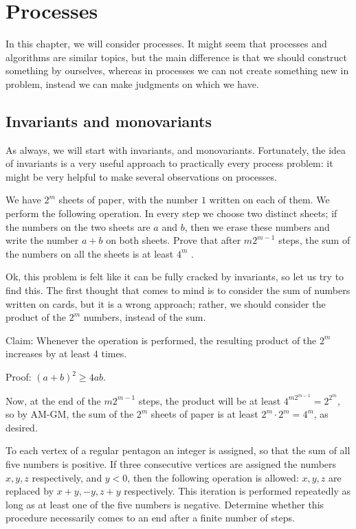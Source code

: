 \chapter{Processes}

In this chapter, we will consider processes. It might seem that processes and algorithms are similar topics, but the main difference is that we should construct something by ourselves, whereas in processes we can not create something new in problem, instead we can make judgments on which we have.

\section{Invariants and monovariants}

As always, we will start with invariants, and monovariants. Fortunately, the idea of invariants is a very useful approach to practically every process problem: it might be very helpful to make several observations on processes.

\begin{example}[ISL 2014]
    We have $2^m$ sheets of paper, with the number $1$ written on each of them. We perform the following operation. In every step we choose two distinct sheets; if the numbers on the two sheets are $a$ and $b$, then we erase these numbers and write the number $a + b$ on both sheets. Prove that after $m2^{m -1}$ steps, the sum of the numbers on all the sheets is at least $4^m$ .
\end{example}

\sol Ok, this problem is felt like it can be fully cracked by invariants, so let us try to find this. The first thought that comes to mind is to consider the sum of numbers written on cards, but it is a wrong approach; rather, we should consider the product of the $2^m$ numbers, instead of the sum.

Claim: Whenever the operation is performed, the resulting product of the $2^m$ increases by at least $4$ times.

Proof: $(a+b)^2 \geq 4ab$.

Now, at the end of the $m2^{m-1}$ steps, the product will be at least $4^{m2^{m-1}} = 2^{2^m}$, so by AM-GM, the sum of the $2^m$ sheets of paper is at least $2^m \cdot 2^m = 4^m$, as desired.

\begin{example}[IMO 1986]
    To each vertex of a regular pentagon an integer is assigned, so that the sum of all five numbers is positive. If three consecutive vertices are assigned the numbers $x,y,z$ respectively, and $y<0$, then the following operation is allowed: $x,y,z$ are replaced by $x+y,-y,z+y$ respectively. This iteration is performed repeatedly as long as at least one of the five numbers is negative. Determine whether this procedure necessarily comes to an end after a finite number of steps.
\end{example}


